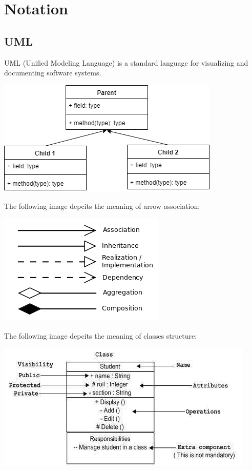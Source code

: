 \documentclass[a4paper, 11pt]{article}
\begin{document}
\newpage

\section{Notation}
    \subsection{UML}
        UML (Unified Modeling Language) is a standard language for visualizing and documenting software systems.
        \begin{center}
            \includegraphics[scale=0.8]{uml_basic}
        \end{center}
        The following image depcits the meaning of arrow association:
        \begin{center}
            \includegraphics{uml_arrow}
        \end{center}
        The following image depcits the meaning of classes structure:
        \begin{center}
            \includegraphics[scale=0.8]{uml_class}
        \end{center}
\end{document}
